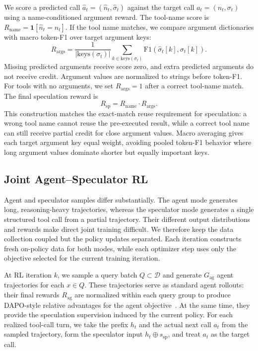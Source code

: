 We score a predicted call $\hat a_t=(\hat n_t,\hat\sigma_t)$ against the target
call $a_t=(n_t,\sigma_t)$ using a name-conditioned argument reward. The tool-name
score is $R_{\mathrm{name}}=\mathbf{1}[\hat n_t=n_t]$. If the tool name matches,
we compare argument dictionaries with macro token-F1 over target argument keys:
\[
R_{\mathrm{args}}
= \frac{1}{|\mathrm{keys}(\sigma_t)|}
\sum_{k\in\mathrm{keys}(\sigma_t)}
\mathrm{F1}\!\left(\hat\sigma_t[k],\sigma_t[k]\right).
\]
Missing predicted arguments receive score zero, and extra predicted arguments
do not receive credit. Argument values are normalized to strings before
token-F1. For tools with no arguments, we set $R_{\mathrm{args}}=1$ after a
correct tool-name match. The final speculation reward is
\begin{equation}
R_{\mathrm{sp}} = R_{\mathrm{name}}\cdot R_{\mathrm{args}}.
\label{eq:reward}
\end{equation}
This construction matches the exact-match reuse requirement for speculation: a wrong tool name cannot
reuse the pre-executed result, while a correct tool name can still receive
partial credit for close argument values. Macro averaging gives each target
argument key equal weight, avoiding pooled token-F1 behavior where long argument
values dominate shorter but equally important keys.

\subsection{Joint Agent--Speculator RL}
\label{sec:method:dual-mode-rollout}

Agent and speculator samples differ substantially. The agent mode generates long,
reasoning-heavy trajectories, whereas the speculator mode generates a single structured tool call 
from a partial trajectory. Their different output distributions and rewards make direct joint training difficult.
We therefore keep the data collection coupled but the policy updates separated. 
Each iteration constructs fresh on-policy data for both modes, while each optimizer step uses only the objective selected for
the current training iteration.

At RL iteration $k$, we sample a query batch $Q\subset\mathcal{D}$ and generate
$G_{\mathrm{ag}}$ agent trajectories for each $x\in Q$. These trajectories serve as standard agent rollouts: their final rewards
$R_{\mathrm{ag}}$ are normalized within each query group to produce
DAPO-style relative advantages for the agent objective~\citep{yu2025dapo}. At
the same time, they provide the speculation supervision induced by the current
policy. For each realized tool-call turn, we take the prefix $h_t$ and the
actual next call $a_t$ from the sampled trajectory, form the speculator input
$h_t\oplus s_{\mathrm{sp}}$, and treat $a_t$ as the target call.

